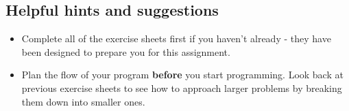 \documentclass[11pt]{report}
\begin{document}
    \subsection*{Helpful hints and suggestions}
\begin{itemize}
    \item Complete all of the exercise sheets first if you haven't already - they have been designed to prepare you for this assignment.
	\item Plan the flow of your program \textbf{before} you start programming. Look back at previous exercise sheets to see how to approach larger problems by breaking them down into smaller ones.
	
	
	

\end{itemize}
\end{document}
